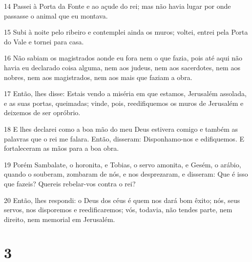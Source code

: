 \par 14 Passei à Porta da Fonte e ao açude do rei; mas não havia lugar por onde passasse o animal que eu montava.
\par 15 Subi à noite pelo ribeiro e contemplei ainda os muros; voltei, entrei pela Porta do Vale e tornei para casa.
\par 16 Não sabiam os magistrados aonde eu fora nem o que fazia, pois até aqui não havia eu declarado coisa alguma, nem aos judeus, nem aos sacerdotes, nem aos nobres, nem aos magistrados, nem aos mais que faziam a obra.
\par 17 Então, lhes disse: Estais vendo a miséria em que estamos, Jerusalém assolada, e as suas portas, queimadas; vinde, pois, reedifiquemos os muros de Jerusalém e deixemos de ser opróbrio.
\par 18 E lhes declarei como a boa mão do meu Deus estivera comigo e também as palavras que o rei me falara. Então, disseram: Disponhamo-nos e edifiquemos. E fortaleceram as mãos para a boa obra.
\par 19 Porém Sambalate, o horonita, e Tobias, o servo amonita, e Gesém, o arábio, quando o souberam, zombaram de nós, e nos desprezaram, e disseram: Que é isso que fazeis? Quereis rebelar-vos contra o rei?
\par 20 Então, lhes respondi: o Deus dos céus é quem nos dará bom êxito; nós, seus servos, nos disporemos e reedificaremos; vós, todavia, não tendes parte, nem direito, nem memorial em Jerusalém.

\chapter{3}

